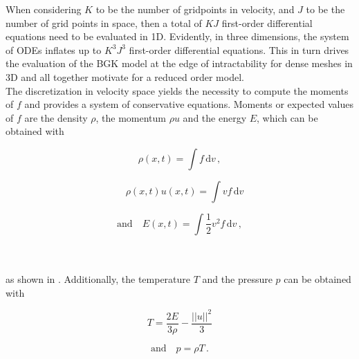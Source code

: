 When considering \(K\) to be the number of gridpoints in velocity, and \(J\) to be the number of grid points in space, then a total of \(KJ\) first-order differential equations need to be evaluated in 1D. Evidently, in three dimensions, the system of ODEs inflates up to \(K^3J^3\) first-order differential equations. This in turn drives the evaluation of the BGK model at the edge of intractability for dense meshes in 3D and all together motivate for a reduced order model.\\
The discretization in velocity space yields the necessity to compute the moments of \(f\) and provides a system of conservative equations. Moments or expected values of \(f\) are the density \(\rho\), the momentum \(\rho u\) and the energy \(E\), which can be obtained with\\
\begin{minipage}{.25\textwidth}
	\begin{equation}\label{Eq:Moments1} 
		\rho(x,t) = \int\! f \,\mathrm{d}v \,,
	\end{equation}
\end{minipage}%
\begin{minipage}{.35\textwidth}
	\begin{equation}\label{Eq:Moments2}
			\quad\rho(x,t) u(x,t) = \int\! v f \,\mathrm{d}v
	\end{equation}
\end{minipage}%
\begin{minipage}{.35\textwidth}
	\begin{equation}\label{Eq:Moments3}
	\mathrm{and}\quad E(x,t) = \int\! \frac{1}{2}v^2 f  \,\mathrm{d}v \,,
	\end{equation}
\end{minipage}\\\\
as shown in  \cite{puppo2019kinetic}. Additionally, the temperature \(T\) and the pressure \(p\) can be obtained with\\
\begin{minipage}{0.45\textwidth}
	\begin{equation}
		T = \frac{2E}{3\rho} - \frac{||u||^2}{3}
	\end{equation}
\end{minipage}%
\begin{minipage}{.45\textwidth}
	\begin{equation}
		\mathrm{and}\quad p = \rho T \,.
	\end{equation}
\end{minipage}\\\\
